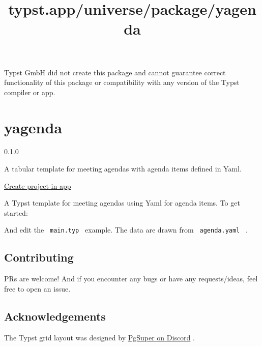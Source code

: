 Typst GmbH did not create this package and cannot guarantee correct
functionality of this package or compatibility with any version of the
Typst compiler or app.


\title{typst.app/universe/package/yagenda}

\label{banner}
\label{template-thumbnail}

\section{yagenda}\label{yagenda}

{ 0.1.0 }

A tabular template for meeting agendas with agenda items defined in
Yaml.

\href{/app?template=yagenda&version=0.1.0}{Create project in app}

\label{readme}
A Typst template for meeting agendas using Yaml for agenda items. To get
started:

\begin{Shaded}
\begin{Highlighting}[]
\end{Highlighting}
\end{Shaded}

And edit the \texttt{\ main.typ\ } example. The data are drawn from
\texttt{\ agenda.yaml\ } .


\subsection{Contributing}\label{contributing}

PRs are welcome! And if you encounter any bugs or have any
requests/ideas, feel free to open an issue.

\subsection{Acknowledgements}\label{acknowledgements}

The Typst grid layout was designed by
\href{https://discord.com/channels/1054443721975922748/1219401775908655115}{PgSuper
on Discord} .

